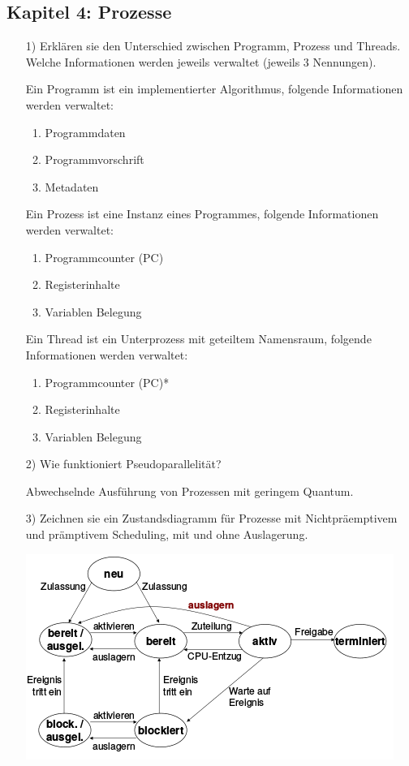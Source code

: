 \documentclass[11pt,a4paper]{article}
\begin{document}
\subsection*{Kapitel 4: Prozesse}
\begin{itemize}
\item[1)] Erklären sie den Unterschied zwischen Programm, Prozess und Threads. Welche Informationen werden jeweils verwaltet (jeweils 3 Nennungen). 

Ein Programm ist ein implementierter Algorithmus, folgende Informationen werden verwaltet:
\begin{enumerate}
\item Programmdaten
\item Programmvorschrift
\item Metadaten
\end{enumerate}
Ein Prozess ist eine Instanz eines Programmes, folgende Informationen werden verwaltet:
\begin{enumerate}
\item Programmcounter (PC)
\item Registerinhalte
\item Variablen Belegung
\end{enumerate}
Ein Thread ist ein Unterprozess mit geteiltem Namensraum, folgende Informationen werden verwaltet:
\begin{enumerate}
\item Programmcounter (PC)*
\item Registerinhalte
\item Variablen Belegung
\end{enumerate}
\item[2)] Wie funktioniert Pseudoparallelität?

Abwechselnde Ausführung von Prozessen mit geringem Quantum.

\item[3)] Zeichnen sie ein Zustandsdiagramm für Prozesse mit Nichtpräemptivem und prämptivem Scheduling, mit und ohne Auslagerung.

\includegraphics[scale=0.95]{zustand.png}
\end{itemize}
\end{document}
